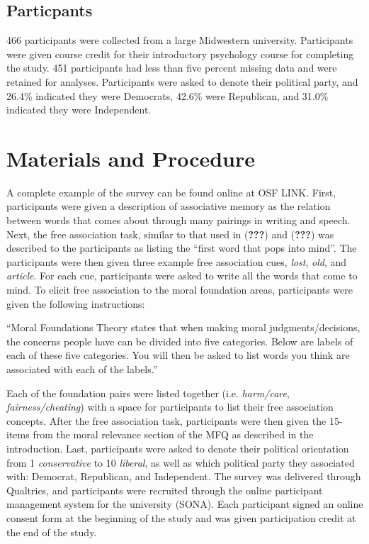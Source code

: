 \documentclass[english,man]{apa6}
\theoremstyle{definition}
\theoremstyle{definition}
\theoremstyle{definition}
\theoremstyle{remark}
\begin{document}
\subsection{Particpants}\label{particpants}

466 participants were collected from a large Midwestern university.
Participants were given course credit for their introductory psychology
course for completing the study. 451 participants had less than five
percent missing data and were retained for analyses. Participants were
asked to denote their political party, and 26.4\% indicated they were
Democrats, 42.6\% were Republican, and 31.0\% indicated they were
Independent.

\section{Materials and Procedure}\label{materials-and-procedure}

A complete example of the survey can be found online at OSF LINK. First,
participants were given a description of associative memory as the
relation between words that comes about through many pairings in writing
and speech. Next, the free association task, similar to that used in
({\textbf{???}}) and ({\textbf{???}}) was described to the participants
as listing the \enquote{first word that pops into mind}. The
participants were then given three example free association cues,
\emph{lost}, \emph{old}, and \emph{article}. For each cue, participants
were asked to write all the words that come to mind. To elicit free
association to the moral foundation areas, participants were given the
following instructions:

\enquote{Moral Foundations Theory states that when making moral
judgments/decisions, the concerns people have can be divided into five
categories. Below are labels of each of these five categories. You will
then be asked to list words you think are associated with each of the
labels.}

Each of the foundation pairs were listed together (i.e.
\emph{harm/care}, \emph{fairness/cheating}) with a space for
participants to list their free association concepts. After the free
association task, participants were then given the 15-items from the
moral relevance section of the MFQ as described in the introduction.
Last, participants were asked to denote their political orientation from
1 \emph{conservative} to 10 \emph{liberal}, as well as which political
party they associated with: Democrat, Republican, and Independent. The
survey was delivered through Qualtrics, and participants were recruited
through the online participant management system for the university
(SONA). Each participant signed an online consent form at the beginning
of the study and was given participation credit at the end of the study.
\end{document}
